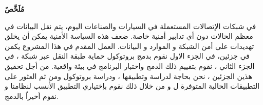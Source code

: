\begin{arabtext}
\begin{center}
\textbf{\Large{مُلَخَّصٌ}}
\end{center}
في شبكات الإتصالات المستعملة في السيارات والصناعات اليوم، يتم  نقل البيانات في معظم الحالات دون أي تدابير أمنية خاصة. ضعف هذه السياسة الأمنية يمكن أن يخلق تهديدات على أمن الشبكة و الموارد و البيانات.
العمل المقدم في هذا المشروع يكمن في جزئين، في الجزء الاول نقوم بدمج بروتوكول حماية طبقة النقل  عبر شبكة  ، في الجزء الثاني ، نقوم بتقييم ذلك الدمج واختبار البرنامج في بيئة واقعية.
من أجل تحقيق هذين الجزئين ، نحن بحاجة لدراسة  وتطبيقها ، ودراسة  بروتوكول  ومن ثم العثور على التطبيقات الحالية المتوفرة ل  و من خلال ذلك نقوم  بإختياري  التطبيق الأنسب لنظامنا
و نقوم أخيراً بالدمج.
\end{arabtext}
